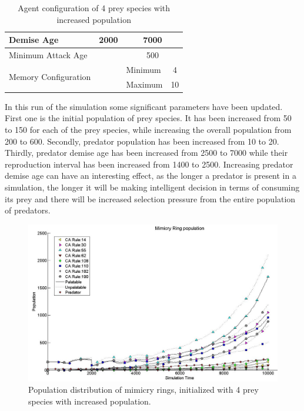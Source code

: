 \documentclass[letterpaper]{article}
\numberwithin{equation}{section}
\begin{document}
\begin{table}[H]
\begin{tabular}{|l|l|c|c|l|c|}
  Demise Age	 									 & \multicolumn{3}{c|}{2000}							& \multicolumn{2}{c|}{7000} \\ \hline
  Minimum Attack Age						 & \multicolumn{3}{c|}{} 						    & \multicolumn{2}{c|}{500} \\ \hline
  \multirow{2}{*}{Memory Configuration} & \multicolumn{3}{c|}{} 					& Minimum & 4 \\ \cline{5-6}
   																			& \multicolumn{3}{c|}{} 					& Maximum & 10 \\ \hline  
\end{tabular}
\caption{Agent configuration of 4 prey species with increased population}
\label{tab:config-table-4-more-prey}
\end{table}

In this run of the simulation some significant parameters have been updated. First one is the initial population of prey species. It has been increased from 50 to 150 for each of the prey species, while increasing the overall population from 200 to 600. Secondly, predator population has been increased from 10 to 20. Thirdly, predator demise age has been increased from 2500 to 7000 while their reproduction interval has been increased from 1400 to 2500. Increasing predator demise age can have an interesting effect, as the longer a predator is present in a simulation, the longer it will be making intelligent decision in terms of consuming its prey and there will be increased selection pressure from the entire population of predators. 

\begin{figure}[H]
	\centering
	\includegraphics[scale=0.45]{../tex/images/simTime10K-4MorePrey}
	\caption[Population distribution of mimicry rings (4 prey species, increased population)]{Population distribution of mimicry rings, initialized with 4 prey species with increased population.}
	\label{fig:plot-4-more-prey}
\end{figure}
\end{document}
